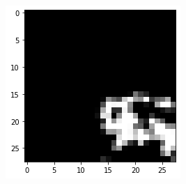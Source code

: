 \documentclass[10pt,twocolumn,hidelinks,letterpaper]{article}
\begin{document}
\begin{figure}
\begin{subfigure}{.59\linewidth}
\begin{subfigure}{.325\linewidth}
  	\end{subfigure}
  	\begin{subfigure}{.325\linewidth}
  		\includegraphics[width=\linewidth]{images/mmaps_example/downsampling28x28_gray.png}
  	\end{subfigure}
  \end{subfigure}

	\caption{}
	\label{mmaps}
\end{figure}








{\small


}
\end{document}
